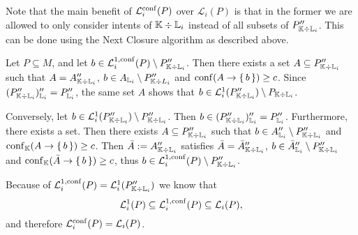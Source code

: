 Note that the main benefit of $\mathcal{L}_{i}^{\operatorname{conf}}(P)$ over $\mathcal{L}_{i}(P)$ is
that in the former we are allowed to only consider intents of ${\mathbb{K}} \div {\ensuremath{\mathbb{L}}}_{i}$
instead of all subsets of $P_{{\mathbb{K}} \div {\ensuremath{\mathbb{L}}}_{i}}''$.  This can be done using the Next
Closure algorithm as described above.

\begin{Proof}
  Let $P \subseteq M$, and let $b \in \mathcal{L}_{i}^{1,\operatorname{conf}}(P) \setminus P_{{\mathbb{K}}
    \div {\ensuremath{\mathbb{L}}}_{i}}''$.  Then there exists a set $A \subseteq P_{{\mathbb{K}} \div {\ensuremath{\mathbb{L}}}_{i}}''$ such that $A = A_{{\mathbb{K}} \div {\ensuremath{\mathbb{L}}}_{i}}''$, $b \in A_{{\mathbb{L}}_{i}}
  \setminus P_{{\mathbb{K}} \div L_{i}}''$ and $\operatorname{conf} (A \to {\ensuremath{\{\,b\,\}}}) \ge c$.  Since $(P_{{\mathbb{K}}
    \div {\ensuremath{\mathbb{L}}}_{i}}'')_{{\mathbb{L}}_{i}}'' = P_{{\mathbb{L}}_{i}}''$, the same set $A$ shows that $b
  \in \mathcal{L}_{i}^{1}(P_{{\mathbb{K}} \div {\ensuremath{\mathbb{L}}}_{i}}'') \setminus P_{{\mathbb{K}} \div {\ensuremath{\mathbb{L}}}_{i}}$.

  Conversely, let $b \in \mathcal{L}_{i}^{1}(P_{{\mathbb{K}} \div {\ensuremath{\mathbb{L}}}_{i}}'') \setminus
  P_{{\mathbb{K}} \div {\ensuremath{\mathbb{L}}}_{i}}''$.  Then $b \in (P_{{\mathbb{K}} \div {\ensuremath{\mathbb{L}}}_{i}}'')_{{\mathbb{L}}_{i}}'' = P_{{\mathbb{L}}_{i}}''$.  Furthermore, there exists a set.  Then there exists $A
  \subseteq P_{{\mathbb{K}} \div {\ensuremath{\mathbb{L}}}_{i}}''$ such that $b \in A_{{\mathbb{L}}_{i}}'' \setminus
  P_{{\mathbb{K}} \div {\ensuremath{\mathbb{L}}}_{i}}''$ and $\operatorname{conf}_{{\mathbb{K}}}(A \to {\ensuremath{\{\, b \,\}}}) \ge c$.  Then $\bar A
  := A_{{\mathbb{K}} \div {\ensuremath{\mathbb{L}}}_{i}}''$ satisfies $\bar A = \bar A_{{\mathbb{K}} \div {\ensuremath{\mathbb{L}}}_{i}}''$,
  $b \in \bar A_{{\mathbb{L}}_{i}}'' \setminus P_{{\mathbb{K}} \div {\ensuremath{\mathbb{L}}}_{i}}''$ and $\operatorname{conf}_{{\mathbb{K}}}(\bar A \to {\ensuremath{\{\,b\,\}}}) \ge c$, thus $b \in \mathcal{L}_{i}^{1,\operatorname{conf}}(P)\setminus
  P_{{\mathbb{K}} \div {\ensuremath{\mathbb{L}}}_{i}}''$.

  Because of $\mathcal{L}_{i}^{1,\operatorname{conf}}(P) = \mathcal{L}_{i}^{1}(P_{{\mathbb{K}} \div {\ensuremath{\mathbb{L}}}_{i}}'')$ we know that
  \begin{equation*}
    \mathcal{L}_{i}^{1}(P) \subseteq \mathcal{L}_{i}^{1,\operatorname{conf}}(P) \subseteq \mathcal{L}_{i}(P),
  \end{equation*}
  and therefore $\mathcal{L}_{i}^{\operatorname{conf}}(P) = \mathcal{L}_{i}(P)$.
\end{Proof}

